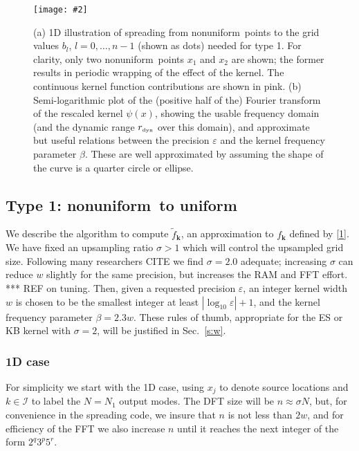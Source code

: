 \documentclass[10pt]{article}
\newcommand{\bfi}{\begin{figure}}
\newcommand{\efi}{\end{figure}}
\newcommand{\ca}[2]{\caption{#1 \label{#2}}}
\newcommand{\ig}[2]{\texttt{[image: \#2]}}
\newcommand{\tbox}[1]{{\mbox{\tiny #1}}}
\newcommand{\mbf}[1]{{\mathbf #1}}
\newcommand{\eps}{\varepsilon}
\newcommand{\kk}{\mbf{k}}
\newcommand{\KK}{{\mathcal I}}     %
\newcommand{\freq}{\beta}          %
\newcommand{\rat}{\sigma}          %
\newcommand{\rmax}{r_\tbox{dyn}}    %
\newcommand{\NU}{{nonuniform}}       %
\newcommand{\U}{{uniform}}
\begin{document}
\bfi[t]  %
\ig{width=6.5in}{spreadalias.eps}
\ca{(a) 1D illustration of spreading from \NU\ points to the grid
  values $b_l$, $l=0,\dots,n-1$ (shown as dots) needed for type 1.
  For clarity, only two \NU\ points $x_1$ and $x_2$ are shown;
  the former results in periodic wrapping of the effect of the kernel.
  The continuous kernel function contributions are shown in pink.
  (b) Semi-logarithmic plot of the (positive half of the)
  Fourier transform of the rescaled
  kernel $\psi(x)$, showing the usable frequency domain (and the
  dynamic range $\rmax$ over this domain), and approximate
  but useful relations between the precision $\eps$
  and the kernel frequency parameter $\beta$.
  These are well approximated by assuming the shape of the curve is
  a quarter circle or ellipse.
}{f:spreadalias}
\efi




\subsection{Type 1: \NU\ to \U}

We describe the algorithm to compute $\tilde f_\kk$, an approximation
to $f_\kk$ defined by \eqref{1}.
We have fixed an upsampling ratio $\rat>1$ which will control the
upsampled grid size.
Following many researchers CITE we find $\rat=2.0$ adequate;
increasing $\rat$ can reduce $w$ slightly for the same precision,
but increases the RAM and FFT effort.
*** REF on tuning.
Then, given a requested precision $\eps$,
an integer kernel width $w$ is chosen
to be the smallest integer at least $|\log_{10} \eps| + 1$,
and the kernel frequency parameter $\freq = 2.3 w$.
These rules of thumb, appropriate for the ES or KB kernel with
$\rat=2$, will be justified in Sec.~\ref{s:w}.

\subsubsection{1D case}
\label{s:1d1}

For simplicity we start with the 1D case, using $x_j$ to denote source
locations and $k\in\KK$ to label the $N=N_1$ output modes.
The DFT size will be $n \approx \rat N$,
but, for convenience in the spreading code, we insure that $n$
is not less than $2w$,
and for efficiency of the FFT we also increase $n$ until it reaches the next
integer of the form $2^q3^p5^r$.
\end{document}
